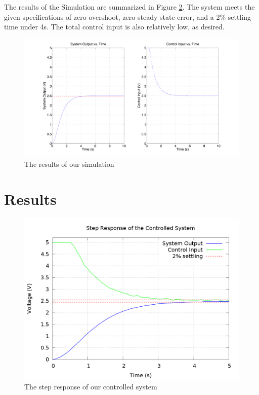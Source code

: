 \documentclass[11pt]{article}
\begin{document}
The results of the Simulation are summarized in Figure \ref{fig:results}.
The system meets the given specifications of zero overshoot, zero steady state error, and a 2\% settling time under 4s.
The total control input is also relatively low, as desired.

\begin{figure}[h]
\centering
\includegraphics[width = 0.8\linewidth]{sim_results}
\caption{The results of our simulation}\label{fig:results}
\end{figure}

\section*{Results}

\begin{figure}[h]
\centering
\includegraphics[width = 0.8\linewidth]{results}
\caption{The step response of our controlled system}\label{fig:results}
\end{figure}
\end{document}
